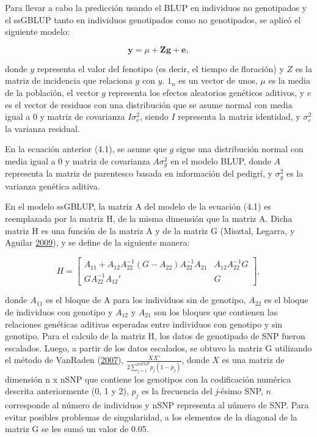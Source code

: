 \documentclass[11pt,spanish,a4paper,oneside,]{book} %
\begin{document}
Para llevar a cabo la predicción usando el BLUP en individuos no genotipados y el ssGBLUP tanto en individuos genotipados como no genotipados, se aplicó el siguiente modelo:

\begin{equation}
\textbf{y} = \mu + \textbf{Z} \textbf{g} + \textbf{e},
\end{equation}

donde \(y\) representa el valor del fenotipo (es decir, el tiempo de floración) y \(Z\) es la matriz de incidencia que relaciona \(g\) con \(y\). \(1_{n}\) es un vector de unos, \(\mu\) es la media de la población, el vector \(g\) representa los efectos aleatorios genéticos aditivos, y \(e\) es el vector de residuos con una distribución que se asume normal con media igual a \(0\) y matriz de covarianza \(I\sigma^{2}_{e}\), siendo \(I\) representa la matriz identidad, y \(\sigma_{e}^{2}\) la varianza residual.

En la ecuación anterior (4.1), se asume que \(g\) sigue una distribución normal con media igual a \(0\) y matriz de covarianza \(A\sigma^{2}_{g}\) en el modelo BLUP, donde \(A\) representa la matriz de parentesco basada en información del pedigrí, y \(\sigma^{2}_{g}\) es la varianza genética aditiva.

En el modelo ssGBLUP, la matriz A del modelo de la ecuación (4.1) es reemplazada por la matriz H, de la misma dimensión que la matriz A. Dicha matriz H es una función de la matriz A y de la matriz G (Misztal, Legarra, y Aguilar \protect\hyperlink{ref-cite:16}{2009}), y se define de la siguiente manera:

\begin{equation}
H =
\begin{bmatrix}
A_{11} + A_{12} A_{22}^{-1} ( G - A_{22} ) A_{22}^{-1}  A_{21} & A_{12} A_{22}^{-1} G \\ 
G A_{22}^{-1} A_{12}' & G 
\end{bmatrix}
,
\end{equation}

donde \(A_{11}\) es el bloque de A para los individuos sin de genotipo, \(A_{22}\) es el bloque de individuos con genotipo y \(A_{12}\) y \(A_{21}\) son los bloques que contienen las relaciones genéticas aditivas esperadas entre individuos con genotipo y sin genotipo. Para el calculo de la matriz H, los datos de genotipado de SNP fueron escalados. Luego, a partir de los datos escalados, se obtuvo la matriz G utilizando el método de VanRaden (\protect\hyperlink{ref-cite:39}{2007}), \(\frac{XX'}{2 \sum_{j=1}^{nSNP} p_{j} (1 - p_{j})}\), donde \(X\) es una matriz de dimensión n x nSNP que contiene los genotipos con la codificación numérica descrita anteriormente (0, 1 y 2), \(p_{j}\) es la frecuencia del \emph{j}-ésimo SNP, \(n\) corresponde al número de individuos y nSNP representa al número de SNP. Para evitar posibles problemas de singularidad, a los elementos de la diagonal de la matriz G se les sumó un valor de 0.05.
\end{document}
